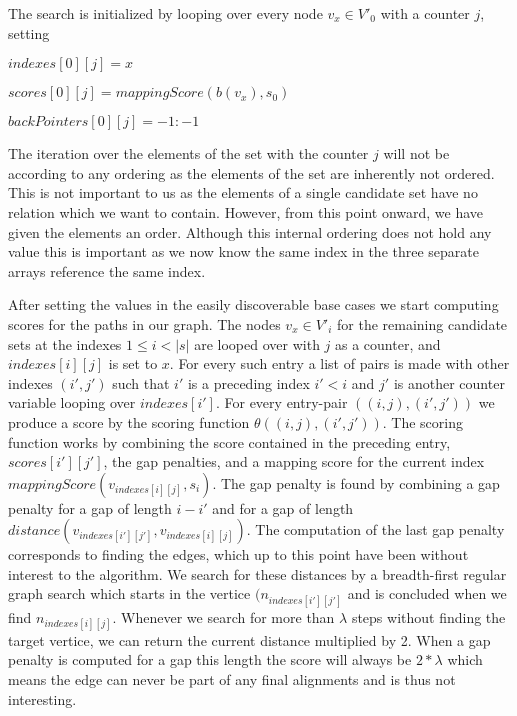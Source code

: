\documentclass[thesis.tex]{subfiles}
\begin{document}
The search is initialized by looping over every node $v_x \in V'_0$ with a counter $j$, setting\\
\par
$indexes[0][j] = x$\par
$scores[0][j] = mappingScore(b(v_x), s_0)$\par
$backPointers[0][j] = -1:-1$\\
\par\noindent
The iteration over the elements of the set with the counter $j$ will not be according to any ordering as the elements of the set are inherently not ordered. This is not important to us as the elements of a single candidate set have no relation which we want to contain. However, from this point onward, we have given the elements an order. Although this internal ordering does not hold any value this is important as we now know the same index in the three separate arrays reference the same index.\\
\par\noindent
After setting the values in the easily discoverable base cases we start computing scores for the paths in our graph. The nodes $v_x \in V'_i$ for the remaining candidate sets at the indexes $1 \leq i < |s|$ are looped over with $j$ as a counter, and $indexes[i][j]$ is set to $x$. For every such entry a list of pairs is made with other indexes $(i', j')$ such that $i'$ is a preceding index $i'<i$ and $j'$ is another counter variable looping over $indexes[i']$. For every entry-pair $((i, j), (i', j'))$ we produce a score by the scoring function $\theta((i, j), (i', j'))$. The scoring function works by combining the score contained in the preceding entry, $scores[i'][j']$, the gap penalties, and a mapping score for the current index $mappingScore(v_{indexes[i][j]}, s_i)$. The gap penalty is found by combining a gap penalty for a gap of length $i-i'$ and for a gap of length $distance(v_{indexes[i'][j']}, v_{indexes[i][j]})$. The computation of the last gap penalty corresponds to finding the edges, which up to this point have been without interest to the algorithm. We search for these distances by a breadth-first regular graph search which starts in the vertice $(n_{indexes[i'][j']}$ and is concluded when we find $n_{indexes[i][j]}$. Whenever we search for more than $\lambda$ steps without finding the target vertice, we can return the current distance multiplied by 2. When a gap penalty is computed for a gap this length the score will always be $2*\lambda$ which means the edge can never be part of any final alignments and is thus not interesting. \\
\end{document}
